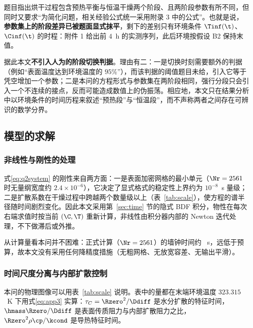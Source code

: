 题目指出烘干过程包含预热平衡与恒温干燥两个阶段、且两阶段参数有所不同，但同时又要求``为简化问题，相关经验公式统一采用附录 3 中的公式''。也就是说，\textbf{参数集上的阶段差异已被题面显式抹平}，剩下的差别只有环境条件 $\Tinf(\t)$、$\Cinf(\t)$ 的时程：附件 1 给出前 $4$~h 的实测序列，此后环境按假设 B2 保持末值。

据此本文\textbf{不引入人为的阶段切换判据}。理由有二：一是切换时刻需要额外的判据（例如``表面温度达到环境温度的 $95\%$''），而该判据的阈值题目未给，引入它等于凭空增加一个参数；二是本问的方程形式与参数集在两阶段相同，强行分段只会引入一个不连续的接点，反而可能造成数值上的伪振荡。相应地，本文只在结果分析中以环境条件的时间历程来叙述``预热段''与``恒温段''，而不声称两者之间存在可辨识的数学分界。

\subsection{模型的求解}
\label{sec:q2analysis}

\subsubsection{非线性与刚性的处理}

式\eqref{eq:q2system} 的刚性来自两方面：一是表面加密网格的最小单元（$\Nr=2561$ 时无量纲宽度约 $2.4\times10^{-6}$），它决定了显式格式的稳定性上界约为 $10^{-8}$~s 量级；二是扩散系数在干燥过程中跨越两个数量级以上（表~\ref{tab:scale}），使方程的谱半径随时间剧烈变化。因此本文采用第~\ref{sec:time} 节的隐式 BDF 积分，物性在每次右端求值时按当前 $(\C,\T)$ 重新计算，非线性由积分器内部的 Newton 迭代处理，不下做滞后或外推。

从计算量看本问并不困难：正式计算（$\Nr=2561$）的墙钟时间约 \QTwoWallS~s，远低于预算，故本文没有采用任何降精度措施（无粗网格、无放宽容差、无输出平滑）。

\subsubsection{时间尺度分离与内部扩散控制}

本问的物理图像可以用表~\ref{tab:scale} 说明。表中的量都在末端环境温度 $323.315$~K 下用式\eqref{eq:app3} 实算：$\tau_C={\Rzero}^2/\Ddiff$ 是水分扩散的特征时间，$\hmass\Rzero/\Ddiff$ 是表面传质阻力与内部扩散阻力之比，${\Rzero}^2\rho\cp/\kcond$ 是导热特征时间。

